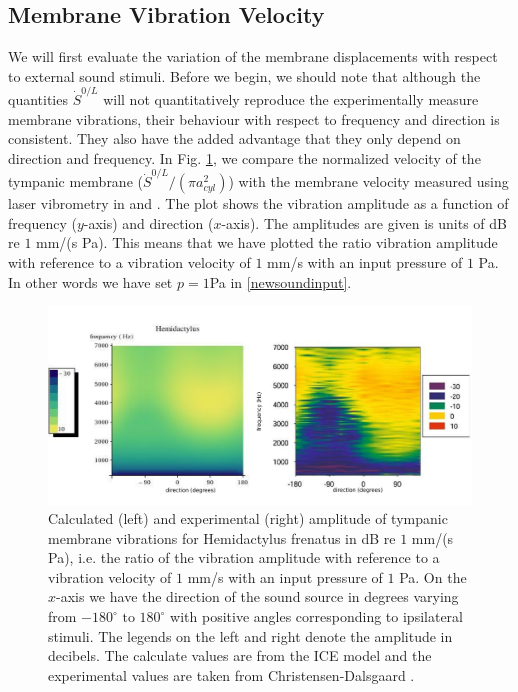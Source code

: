 \subsection{Membrane Vibration Velocity}\label{vibvelocity}
We will first evaluate the variation of the membrane displacements with respect to external 
sound stimuli. Before we begin, we should note that although the quantities
$\dot{S}^{0/L}$ will not quantitatively reproduce the experimentally measure membrane vibrations, their behaviour with respect to
frequency and direction is consistent. They also have the added advantage that they only depend on direction and frequency. In Fig. \ref{hemidactylusvibampfull},
we compare the normalized velocity of the tympanic membrane ($\dot{S}^{0/L}/(\pi a^2_{cyl})$) with the membrane velocity measured using laser vibrometry
in \cite{dalsgaardmanley1} and \cite{dalsgaardmanley2}. The plot shows the vibration amplitude as a function of frequency ($y$-axis) and direction ($x$-axis). The amplitudes are given
is units of dB re $1$ mm/(s Pa). This means that we have plotted the ratio vibration amplitude with reference to a vibration velocity of $1$ mm/s with an input pressure of $1$ Pa.
In other words we have set $p=1$Pa in \eqref{newsoundinput}.
\begin{figure}[ht!]
 \centering
 \includegraphics[width=1.0\linewidth]{Diagrams/Plots/hemidactylusvibampfull.png}
 \caption[Vibration amplitude for the common house gecko]{Calculated (left) and experimental (right) amplitude of tympanic membrane vibrations for Hemidactylus frenatus
 in dB re $1$ mm/(s Pa), i.e. the ratio of the vibration amplitude with reference to a vibration velocity of $1$ mm/s with an input pressure of $1$ Pa. On the $x$-axis we have
 the direction of the sound source in degrees varying from $-180^\circ\mbox{ to }180^\circ$ with positive angles corresponding to ipsilateral stimuli. The legends on the left and
 right denote the amplitude in decibels. The calculate values are from the ICE model and the experimental values are taken from Christensen-Dalsgaard \cite{dalsgaardmanley2}.}
  \label{hemidactylusvibampfull}
\end{figure}

